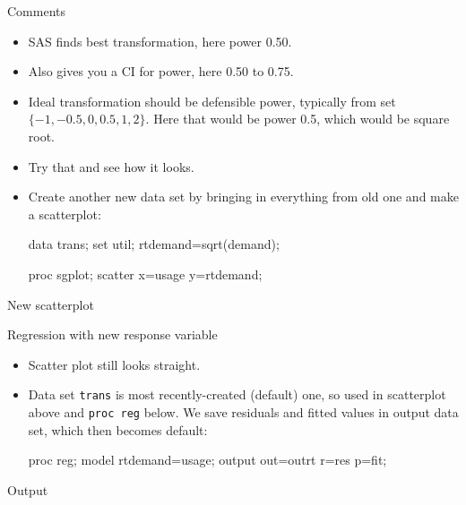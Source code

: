 \documentclass[unknownkeysallowed]{beamer}\usepackage[]{graphicx}\usepackage[]{color}
\begin{document}
\begin{frame}[fragile]{Comments}
  \begin{itemize}
  \item SAS finds best transformation, here power 0.50.
  \item Also gives you a CI for power, here 0.50 to 0.75.
  \item Ideal transformation should be defensible power, typically
    from set $\{-1,-0.5,0,0.5,1,2\}$. Here that
    would be power 0.5, which would be square root.
  \item Try that and see how it looks.
  \item Create another new data set by bringing in everything from old
    one and make a scatterplot:
    
\begin{Datastep}
data trans;
  set util;
  rtdemand=sqrt(demand);        
\end{Datastep}
\begin{Sascode}[store=ddf]
proc sgplot;
  scatter x=usage y=rtdemand;
\end{Sascode}

  \end{itemize}
\end{frame}


\begin{frame}[fragile]{New scatterplot}

  
\end{frame}

\begin{frame}[fragile]{Regression with new response variable}

  \begin{itemize}
  \item Scatter plot still looks straight.
  \item Data set \texttt{trans} is most recently-created (default)
    one, so used in scatterplot above and \texttt{proc reg} below. We
    save residuals and fitted values in output data set, which then
    becomes default:
    
    \begin{Sascode}[store=ddg]
proc reg;
  model rtdemand=usage;
  output out=outrt r=res p=fit;      
    \end{Sascode}
  \end{itemize}
\end{frame}

\begin{frame}[fragile]{Output}

  
\end{frame}
\end{document}
